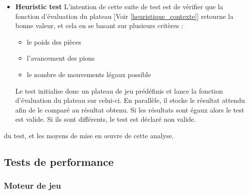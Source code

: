 \huge\documentclass{article}
\begin{document}
\begin{itemize}
    \newpage
    \item \textbf{Heuristic test}\newline
    L'intention de cette suite de test est de vérifier que la fonction d'évaluation du plateau [Voir \ref{heuristique_contexte}]
    retourne la bonne valeur, et cela en se basant sur plusieurs critères : 
    \begin{itemize}
        \item le poids des pièces
        \item l'avancement des pions
        \item le nombre de mouvements légaux possible
    \end{itemize}
    Le test initialise donc un plateau de jeu prédéfinis et lance la fonction d'évaluation du plateau sur celui-ci.\newline
    En parallèle, il stocke le résultat attendu afin de le comparé au résultat obtenu.\newline
    Si les résultats sont égaux alors le test est valide.
    Si ils sont différents, le test est déclaré non valide.
    
    
    
    
    
    
    
\end{itemize}
du test, et les moyens de mise en œuvre de cette analyse.
\subsection{Tests de performance}
\subsubsection{Moteur de jeu}
\end{document}

